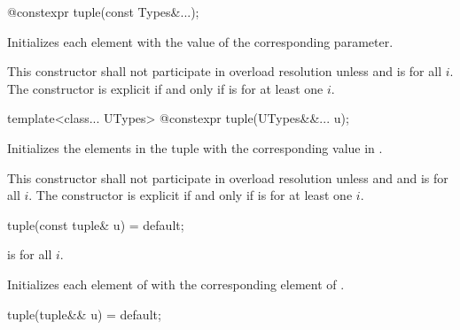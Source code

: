 %
\begin{itemdecl}
@\EXPLICIT@ constexpr tuple(const Types&...);
\end{itemdecl}

\begin{itemdescr}
\pnum
\effects Initializes each element with the value of the
corresponding parameter.

\pnum
\remarks This constructor shall not participate in overload resolution unless
 and 
is  for all $i$. The constructor is explicit if and only if
 is 
for at least one $i$.
\end{itemdescr}

%
\begin{itemdecl}
template<class... UTypes> @\EXPLICIT@ constexpr tuple(UTypes&&... u);
\end{itemdecl}

\begin{itemdescr}
\pnum
\effects Initializes the elements in the tuple with the
corresponding value in .

\pnum
\remarks This constructor shall not participate in overload resolution unless
 \tcode{==}  and
 and 
is  for all $i$. The constructor is explicit if and only if
 is 
for at least one $i$.
\end{itemdescr}

%
\begin{itemdecl}
tuple(const tuple& u) = default;
\end{itemdecl}

\begin{itemdescr}
\pnum
\requires {} is  for all $i$.

\pnum
\effects Initializes each element of  with the
corresponding element of .
\end{itemdescr}

%
\begin{itemdecl}
tuple(tuple&& u) = default;
\end{itemdecl}

